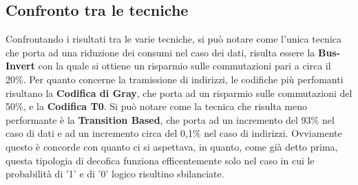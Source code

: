 \subsection{Confronto tra le tecniche}
Confrontando i risultati tra le varie tecniche, si può notare come l'unica tecnica che porta ad una riduzione dei consumi nel caso dei dati, risulta essere la \textbf{Bus-Invert} con la quale si ottiene un risparmio sulle commutazioni pari a circa il 20\%. 
Per quanto concerne la tramissione di indirizzi, le codifiche più perfomanti risultano la \textbf{Codifica di Gray}, che porta ad un risparmio sulle commutazioni del 50\%, e la \textbf{Codifica T0}.
Si può notare come la tecnica che risulta meno performante è la \textbf{Transition Based}, che porta ad un incremento del 93\% nel caso di dati e ad un incremento circa del 0,1\% nel caso di indirizzi. Ovviamente questo è concorde con quanto ci si aspettava, in quanto, come già detto prima, questa tipologia di decofica funziona efficentemente solo nel caso in cui le probabilità di '1' e di '0' logico risultino sbilanciate.

